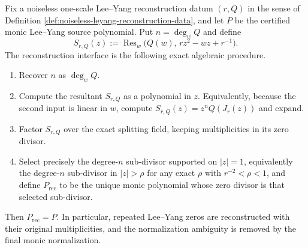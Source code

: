 \begin{proposition}\label{prop:exact-reconstruction-interface}
Fix a noiseless one-scale Lee--Yang reconstruction datum \((r,Q)\) in the sense of Definition \ref{def:noiseless-leyang-reconstruction-data}, and let \(P\) be the certified monic Lee--Yang source polynomial.  Put \(n=\deg_w Q\) and define
\[
S_{r,Q}(z):=\operatorname{Res}_w\!\bigl(Q(w),\,r z^2-w z+r^{-1}\bigr).
\]
The reconstruction interface is the following exact algebraic procedure.
\begin{enumerate}[label=\textup{(\alph*)}]
  \item Recover \(n\) as \(\deg_w Q\).
  \item Compute the resultant \(S_{r,Q}\) as a polynomial in \(z\).  Equivalently, because the second input is linear in \(w\), compute \(S_{r,Q}(z)=z^n Q(J_r(z))\) and expand.
  \item Factor \(S_{r,Q}\) over the exact splitting field, keeping multiplicities in its zero divisor.
  \item Select precisely the degree-\(n\) sub-divisor supported on \(|z|=1\), equivalently the degree-\(n\) sub-divisor in \(|z|>\rho\) for any exact \(\rho\) with \(r^{-2}<\rho<1\), and define \(P_{\mathrm{rec}}\) to be the unique monic polynomial whose zero divisor is that selected sub-divisor.
\end{enumerate}
Then \(P_{\mathrm{rec}}=P\).  In particular, repeated Lee--Yang zeros are reconstructed with their original multiplicities, and the normalization ambiguity is removed by the final monic normalization.
\end{proposition}

